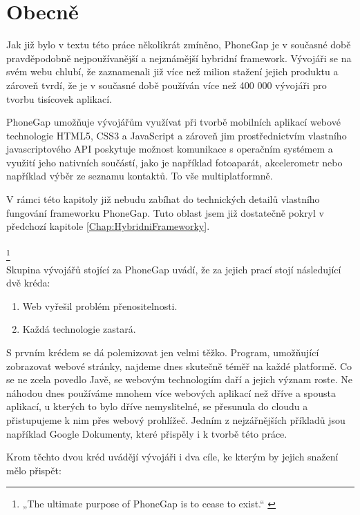 \section{Obecně}
Jak již bylo v textu této práce několikrát zmíněno, PhoneGap je v současné době pravděpodobně nejpoužívanější a nejznámější hybridní framework. Vývojáři se na svém webu chlubí, že zaznamenali již více než milion stažení jejich produktu a zároveň tvrdí, že je v současné době používán více než 400 000 vývojáři pro tvorbu tisícovek aplikací.

PhoneGap umožňuje vývojářům využívat při tvorbě mobilních aplikací webové technologie HTML5, CSS3 a JavaScript a zároveň jim prostřednictvím vlastního javascriptového API poskytuje možnost komunikace s operačním systémem a využití jeho nativních součástí, jako je například fotoaparát, akcelerometr nebo například výběr ze seznamu kontaktů. To vše multiplatformně.

V rámci této kapitoly již nebudu zabíhat do technických detailů vlastního fungování frameworku PhoneGap. Tuto oblast jsem již dostatečně pokryl v předchozí kapitole \ref{Chap:HybridniFrameworky}.\\ \\

\textit{ \cite{how_cordova_becomes_phonegap}}
\footnote{„The ultimate purpose of PhoneGap is to cease to exist.“ \cite{how_cordova_becomes_phonegap}} \\

Skupina vývojářů stojící za PhoneGap uvádí, že za jejich prací stojí následující dvě kréda:

\begin{enumerate}
	\item Web vyřešil problém přenositelnosti.
	\item Každá technologie zastará.
\end{enumerate}

S prvním krédem se dá polemizovat jen velmi těžko. Program, umožňující zobrazovat webové stránky, najdeme dnes skutečně téměř na každé platformě. Co se ne zcela povedlo Javě, se webovým technologiím daří a jejich význam roste. Ne náhodou dnes používáme mnohem více webových aplikací než dříve a spousta aplikací, u kterých to bylo dříve nemyslitelné, se přesunula do cloudu a přistupujeme k nim přes webový prohlížeč. Jedním z nejzářnějších příkladů jsou například Google Dokumenty, které přispěly i k tvorbě této práce.

Krom těchto dvou kréd uvádějí vývojáři i dva cíle, ke kterým by jejich snažení mělo přispět:

